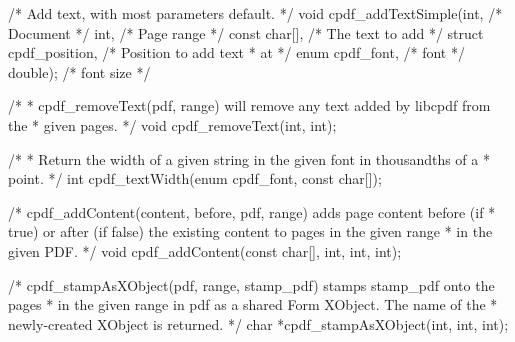 /* Add text, with most parameters default. */
void cpdf_addTextSimple(int,                  /* Document */
                        int,                  /* Page range */
                        const char[],         /* The text to add */
                        struct cpdf_position, /* Position to add text
                                               * at */
                        enum cpdf_font,       /* font */
                        double);              /* font size */

/*
 * cpdf_removeText(pdf, range) will remove any text added by libcpdf from the
 * given pages.
 */
void cpdf_removeText(int, int);

/*
 * Return the width of a given string in the given font in thousandths of a
 * point.
 */
int cpdf_textWidth(enum cpdf_font, const char[]);

/* cpdf_addContent(content, before, pdf, range) adds page content before (if
 * true) or after (if false) the existing content to pages in the given range
 * in the given PDF. */
void cpdf_addContent(const char[], int, int, int);

/* cpdf_stampAsXObject(pdf, range, stamp_pdf) stamps stamp_pdf onto the pages
 * in the given range in pdf as a shared Form XObject. The name of the
 * newly-created XObject is returned. */
char *cpdf_stampAsXObject(int, int, int);

